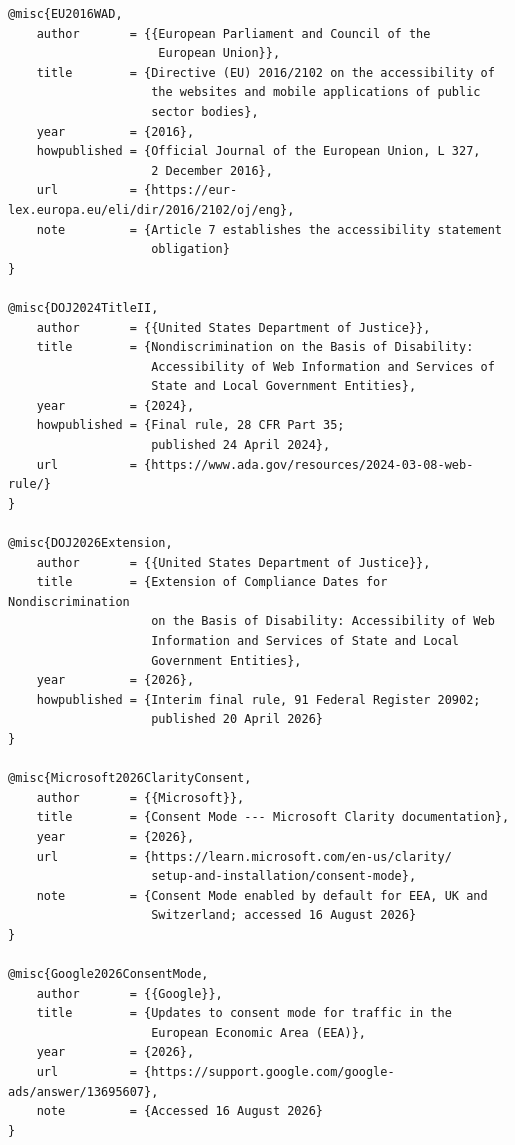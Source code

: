 \documentclass[11pt,a4paper]{article}
\begin{document}
\footnotesize
\begin{verbatim}
@misc{EU2016WAD,
    author       = {{European Parliament and Council of the
                     European Union}},
    title        = {Directive (EU) 2016/2102 on the accessibility of
                    the websites and mobile applications of public
                    sector bodies},
    year         = {2016},
    howpublished = {Official Journal of the European Union, L 327,
                    2 December 2016},
    url          = {https://eur-lex.europa.eu/eli/dir/2016/2102/oj/eng},
    note         = {Article 7 establishes the accessibility statement
                    obligation}
}

@misc{DOJ2024TitleII,
    author       = {{United States Department of Justice}},
    title        = {Nondiscrimination on the Basis of Disability:
                    Accessibility of Web Information and Services of
                    State and Local Government Entities},
    year         = {2024},
    howpublished = {Final rule, 28 CFR Part 35;
                    published 24 April 2024},
    url          = {https://www.ada.gov/resources/2024-03-08-web-rule/}
}

@misc{DOJ2026Extension,
    author       = {{United States Department of Justice}},
    title        = {Extension of Compliance Dates for Nondiscrimination
                    on the Basis of Disability: Accessibility of Web
                    Information and Services of State and Local
                    Government Entities},
    year         = {2026},
    howpublished = {Interim final rule, 91 Federal Register 20902;
                    published 20 April 2026}
}

@misc{Microsoft2026ClarityConsent,
    author       = {{Microsoft}},
    title        = {Consent Mode --- Microsoft Clarity documentation},
    year         = {2026},
    url          = {https://learn.microsoft.com/en-us/clarity/
                    setup-and-installation/consent-mode},
    note         = {Consent Mode enabled by default for EEA, UK and
                    Switzerland; accessed 16 August 2026}
}

@misc{Google2026ConsentMode,
    author       = {{Google}},
    title        = {Updates to consent mode for traffic in the
                    European Economic Area (EEA)},
    year         = {2026},
    url          = {https://support.google.com/google-ads/answer/13695607},
    note         = {Accessed 16 August 2026}
}
\end{verbatim}
\normalsize
\end{document}
